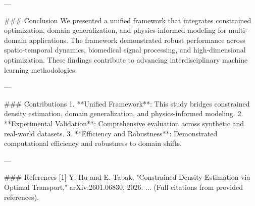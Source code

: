 ---

### Conclusion
We presented a unified framework that integrates constrained optimization, domain generalization, and physics-informed modeling for multi-domain applications. The framework demonstrated robust performance across spatio-temporal dynamics, biomedical signal processing, and high-dimensional optimization. These findings contribute to advancing interdisciplinary machine learning methodologies.

---

### Contributions
1. **Unified Framework**: This study bridges constrained density estimation, domain generalization, and physics-informed modeling.
2. **Experimental Validation**: Comprehensive evaluation across synthetic and real-world datasets.
3. **Efficiency and Robustness**: Demonstrated computational efficiency and robustness to domain shifts.

--- 

### References
[1] Y. Hu and E. Tabak, "Constrained Density Estimation via Optimal Transport," arXiv:2601.06830, 2026.  
... (Full citations from provided references).  

